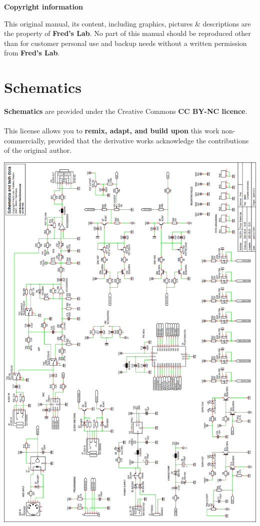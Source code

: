 \documentclass{scrartcl}
\begin{document}
\vspace{0.5cm}
\textbf{Copyright information}

This original manual, its content, including graphics, pictures \& descriptions are the property of \textbf{Fred's Lab}. No part of this manual should be reproduced other than for customer personal use and backup needs without a written permission from \textbf{Fred's Lab}.

\pagebreak

\section{Schematics}
\textbf{Schematics} are provided under the Creative Commons \textbf{CC BY-NC licence}.\\\\
This license allows you to \textbf{remix, adapt, and build upon} this work non-commercially, provided that the derivative works acknowledge the contributions of the original author. 
\vspace{0.25cm}
\begin{center}
    \includegraphics[scale=0.72,origin=c]{assets/schema-full.png}
\end{center}
\end{document}
